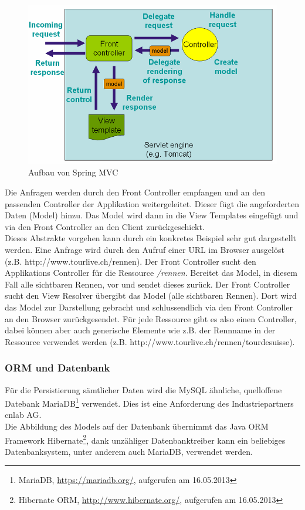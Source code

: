 \begin{figure}[H]
	\centering
	\includegraphics[width=130mm]{images/tourliveweb/springmvc.png}
	\caption{Aufbau von Spring MVC \cite{springsourcemvc2011}}
	\label{fig:springmvc}
\end{figure}

Die Anfragen werden durch den Front Controller empfangen und an den passenden Controller der Applikation weitergeleitet. Dieser fügt die angeforderten Daten (Model) hinzu. Das Model wird dann in die View Templates eingefügt und via den Front Controller an den Client zurückgeschickt.
\\
Dieses Abstrakte vorgehen kann durch ein konkretes Beispiel sehr gut dargestellt werden. Eine Anfrage wird durch den Aufruf einer URL im Browser ausgelöst (z.B. http://www.tourlive.ch/rennen). Der Front Controller sucht den Applikations Controller für die Ressource \textit{/rennen}. Bereitet das Model, in diesem Fall alle sichtbaren Rennen, vor und sendet dieses zurück. Der Front Controller sucht den View Resolver übergibt das Model (alle sichtbaren Rennen). Dort wird das Model zur Darstellung gebracht und schlussendlich via den Front Controller an den Browser zurückgesendet. Für jede Ressource gibt es also einen Controller, dabei können aber auch generische Elemente wie z.B. der Rennname in der Ressource verwendet werden (z.B. http://www.tourlive.ch/rennen/tourdesuisse).

\subsubsection{ORM und Datenbank}
Für die Persistierung sämtlicher Daten wird die MySQL ähnliche, quelloffene Datebank MariaDB\footnote{MariaDB, \url{https://mariadb.org/}, aufgerufen am 16.05.2013} verwendet. Dies ist eine Anforderung des Industriepartners cnlab AG.
\\
Die Abbildung des Models auf der Datenbank übernimmt das Java ORM Framework Hibernate\footnote{Hibernate ORM, \url{http://www.hibernate.org/}, aufgerufen am 16.05.2013}, dank unzähliger Datenbanktreiber kann ein beliebiges Datenbanksystem, unter anderem auch MariaDB, verwendet werden.

